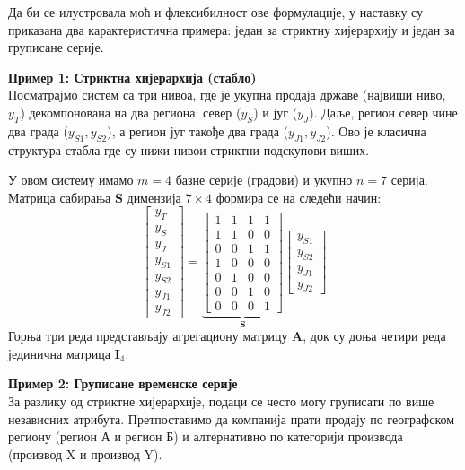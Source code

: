 \documentclass[12pt,oneside]{memoir}
\begin{document}
Да би се илустровала моћ и флексибилност ове формулације, у наставку су приказана два карактеристична примера: један за стриктну хијерархију и један за груписане серије.

\vspace{1em}
\noindent \textbf{Пример 1: Стриктна хијерархија (стабло)} \\
Посматрајмо систем са три нивоа, где је укупна продаја државе (највиши ниво, $y_T$) декомпонована на два региона: север ($y_S$) и југ ($y_J$). Даље, регион север чине два града ($y_{S1}, y_{S2}$), а регион југ такође два града ($y_{J1}, y_{J2}$). Ово је класична структура стабла где су нижи нивои стриктни подскупови виших.

У овом систему имамо $m=4$ базне серије (градови) и укупно $n=7$ серија. Матрица сабирања $\mathbf{S}$ димензија $7 \times 4$ формира се на следећи начин:
\begin{equation}
    \begin{bmatrix} 
    y_T \\ \hline
    y_S \\ 
    y_J \\ \hline
    y_{S1} \\
    y_{S2} \\
    y_{J1} \\
    y_{J2}
    \end{bmatrix} 
    = 
    \underbrace{
    \begin{bmatrix} 
    1 & 1 & 1 & 1 \\ \hline
    1 & 1 & 0 & 0 \\ 
    0 & 0 & 1 & 1 \\ \hline
    1 & 0 & 0 & 0 \\
    0 & 1 & 0 & 0 \\
    0 & 0 & 1 & 0 \\
    0 & 0 & 0 & 1 
    \end{bmatrix}
    }_{\mathbf{S}}
    \begin{bmatrix} 
    y_{S1} \\ 
    y_{S2} \\
    y_{J1} \\
    y_{J2}
    \end{bmatrix}
\end{equation}
Горња три реда представљају агрегациону матрицу $\mathbf{A}$, док су доња четири реда јединична матрица $\mathbf{I}_4$.

\vspace{1em}
\noindent \textbf{Пример 2: Груписане временске серије} \\
За разлику од стриктне хијерархије, подаци се често могу груписати по више независних атрибута. Претпоставимо да компанија прати продају по географском региону (регион А и регион Б) и алтернативно по категорији производа (производ X и производ Y). 
\end{document}
